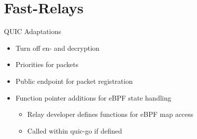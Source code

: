 \documentclass[shortpres,aspectratio=43]{beamer}
\newlength{\mylength}
\begin{document}

\section{Fast-Relays}

\begin{frame}{}
  \tableofcontents[currentsection]
\end{frame}

\begin{frame}{QUIC Adaptations}
    \begin{minipage}{\textwidth}
        \begin{itemize}
            \item Turn off en- and decryption
            \vspace{2\mylength}
            \item Priorities for packets
            \vspace{2\mylength}
            \item Public endpoint for packet registration
            \vspace{2\mylength}
            \item Function pointer additions for eBPF state handling
            \vspace{2\mylength}
            \begin{itemize}
                \item Relay developer defines functions for eBPF map access
                \vspace{2\mylength}
                \item Called within quic-go if defined
            \end{itemize}
        \end{itemize}
    \end{minipage}
\end{frame}
\end{document}
